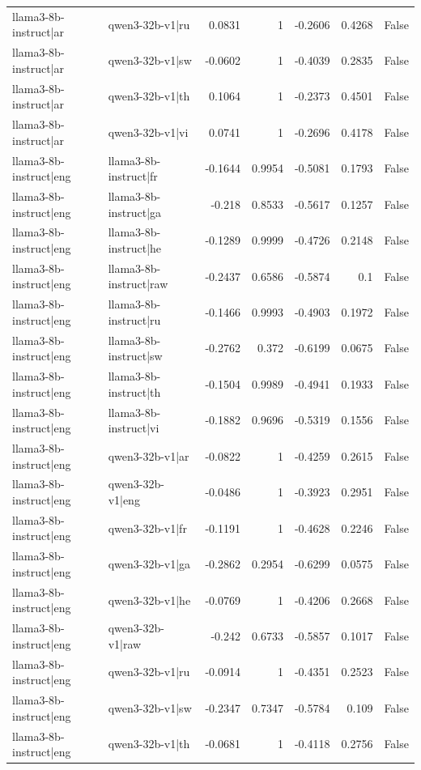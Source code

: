 \begin{table}
\begin{tabular}{l l r r r r l}
llama3-8b-instruct|ar & qwen3-32b-v1|ru & 0.0831 & 1 & -0.2606 & 0.4268 & False \\
llama3-8b-instruct|ar & qwen3-32b-v1|sw & -0.0602 & 1 & -0.4039 & 0.2835 & False \\
llama3-8b-instruct|ar & qwen3-32b-v1|th & 0.1064 & 1 & -0.2373 & 0.4501 & False \\
llama3-8b-instruct|ar & qwen3-32b-v1|vi & 0.0741 & 1 & -0.2696 & 0.4178 & False \\
llama3-8b-instruct|eng & llama3-8b-instruct|fr & -0.1644 & 0.9954 & -0.5081 & 0.1793 & False \\
llama3-8b-instruct|eng & llama3-8b-instruct|ga & -0.218 & 0.8533 & -0.5617 & 0.1257 & False \\
llama3-8b-instruct|eng & llama3-8b-instruct|he & -0.1289 & 0.9999 & -0.4726 & 0.2148 & False \\
llama3-8b-instruct|eng & llama3-8b-instruct|raw & -0.2437 & 0.6586 & -0.5874 & 0.1 & False \\
llama3-8b-instruct|eng & llama3-8b-instruct|ru & -0.1466 & 0.9993 & -0.4903 & 0.1972 & False \\
llama3-8b-instruct|eng & llama3-8b-instruct|sw & -0.2762 & 0.372 & -0.6199 & 0.0675 & False \\
llama3-8b-instruct|eng & llama3-8b-instruct|th & -0.1504 & 0.9989 & -0.4941 & 0.1933 & False \\
llama3-8b-instruct|eng & llama3-8b-instruct|vi & -0.1882 & 0.9696 & -0.5319 & 0.1556 & False \\
llama3-8b-instruct|eng & qwen3-32b-v1|ar & -0.0822 & 1 & -0.4259 & 0.2615 & False \\
llama3-8b-instruct|eng & qwen3-32b-v1|eng & -0.0486 & 1 & -0.3923 & 0.2951 & False \\
llama3-8b-instruct|eng & qwen3-32b-v1|fr & -0.1191 & 1 & -0.4628 & 0.2246 & False \\
llama3-8b-instruct|eng & qwen3-32b-v1|ga & -0.2862 & 0.2954 & -0.6299 & 0.0575 & False \\
llama3-8b-instruct|eng & qwen3-32b-v1|he & -0.0769 & 1 & -0.4206 & 0.2668 & False \\
llama3-8b-instruct|eng & qwen3-32b-v1|raw & -0.242 & 0.6733 & -0.5857 & 0.1017 & False \\
llama3-8b-instruct|eng & qwen3-32b-v1|ru & -0.0914 & 1 & -0.4351 & 0.2523 & False \\
llama3-8b-instruct|eng & qwen3-32b-v1|sw & -0.2347 & 0.7347 & -0.5784 & 0.109 & False \\
llama3-8b-instruct|eng & qwen3-32b-v1|th & -0.0681 & 1 & -0.4118 & 0.2756 & False \\

\end{tabular}
\end{table}
